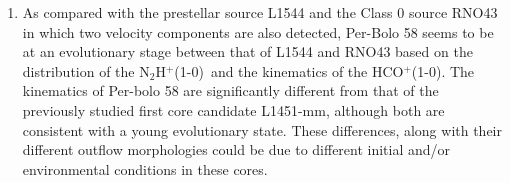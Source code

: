 \documentclass[iop]{emulateapj}
\newcommand{\nthp}{\mbox{\rm N$_2$H$^+$(1-0)}}
\newcommand{\hcop}{\mbox{\rm  HCO$^+$(1-0)}}
\begin{document}
\begin{enumerate}
\item
As compared with the prestellar source L1544 \citep{2002CaselliMolecular} and the Class 0 source RNO43 \citep{2011TobinComplex} in which two velocity components are also detected, Per-Bolo 58 seems to be at an evolutionary  stage between that of L1544 and RNO43 based on the distribution of the \nthp\ and the kinematics of the \hcop.
The kinematics of Per-bolo 58 are significantly  different from that of the previously studied first core candidate L1451-mm, although both are consistent with a young evolutionary state. These differences, along with their different outflow morphologies could be due to different initial and/or environmental conditions in these cores.





\end{enumerate}


\end{document}
